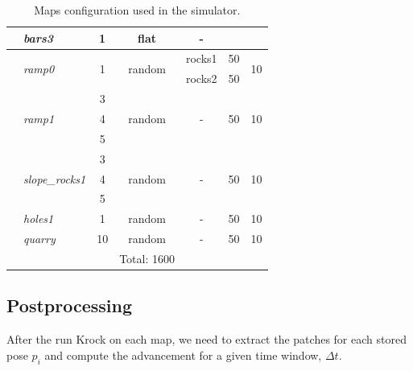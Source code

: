 \documentclass[../document.tex]{subfiles}
\begin{document}
\begin{table}[H]
\begin{tabular}[]{@{}llccccc@{}}
      \hline
      &\emph{bars3} & 1 & flat  & - &  &  \\
      \hline
      &\multirow{2}{*}{\emph{ramp0}} & \multirow{2}{*}{1} & \multirow{2}{*}{random} & rocks1 & 50 & \multirow{2}{*}{10} \\
      &&&& rocks2 & 50 &  \\
      \hline
      &\multirow{3}{*}{\emph{ramp1}} & 3 & \multirow{3}{*}{random} & \multirow{3}{*}{-} & \multirow{3}{*}{50} & \multirow{3}{*}{10} \\
      && 4 &&&& \\
      && 5 &&&& \\
      \hline 
      &\multirow{3}{*}{\emph{slope\_rocks1}} & 3 & \multirow{3}{*}{random} & \multirow{3}{*}{-} & \multirow{3}{*}{50} & \multirow{3}{*}{10} \\
      && 4 &&&& \\
      && 5 &&&& \\
      \hline
      &\emph{holes1} & 1 &random & - & 50 & 10 \\
      \hline
      &\emph{quarry} & 10 &random & - & 50 & 10 \\
      &&& Total: 1600 \\ 
      \bottomrule   
  
    \end{tabular}
    \caption{Maps configuration used in the simulator.}
  
  \end{table}
  


\subsection{Postprocessing}
After the run Krock on each map, we need to extract the patches for each stored pose $p_i$ and compute the advancement for a given time window, $\Delta t$.
\end{document}
